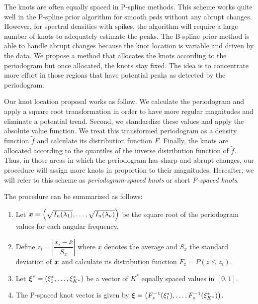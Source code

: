 \documentclass[twocolumn,final]{svjour3}
\newcommand{\bm}[1]{\mbox{\boldmath $#1$}}
\begin{document}
The knots are often equally spaced in P-spline methods.  This scheme works quite well in the P-spline prior algorithm for smooth psds without any abrupt changes.  However, for spectral densities with spikes, the algorithm will require a large number of knots to adequately estimate the peaks.  The B-spline prior method is able to handle abrupt changes because the knot location is variable and  driven by the data.  We propose a method that allocates the knots according to the periodogram but once allocated, the knots stay fixed.  The idea is to concentrate more effort in those regions that have potential peaks as detected by the periodogram.  

Our knot location proposal works as follow.  We calculate the periodogram and apply a square root transformation in order to have more regular magnitudes and eliminate a potential trend.  Second, we standardize these values and apply the absolute value function.  We treat this transformed periodogram as a density function $\widetilde{f}$ and calculate its distribution function $F$.  Finally, the knots are allocated according to the quantiles of the inverse distribution function of $\widetilde{f}$.  Thus, in those areas in which the periodogram has sharp and abrupt changes, our procedure will assign more knots in proportion to their magnitudes. Hereafter, we will refer to this scheme as \textit{periodogram-spaced knots} or short \textit{P-spaced knots}.

The procedure can be summarized as follows:
\begin{enumerate}
	\item Let $\bm{x} = \left (\sqrt{I_n(\lambda_1)}, \dots, \sqrt{I_n(\lambda_{\nu})} \right)$ be the square root of the periodogram values for each angular frequency.
	\item Define $z_i = \left|\dfrac{x_i - \bar{x}}{S_x} \right|$ where $\bar{x}$ denotes the average and $S_x$ the standard deviation of ${\bm x}$ and calculate its distribution function $F_z = P(z \leq z_i)$.
	\item Let $\bm{\xi}^* = \left(\xi_1^*,\dots,\xi_{K^*}^* \right)$ be a vector of $K^*$ equally spaced values in $[0,1]$.
	\item The P-spaced knot vector is given by $\bm{\xi} = \left(F_{z}^{-1}(\xi^*_1),\dots, F_{z}^{-1}(\xi^*_{K^*}) \right)$.
	
\end{enumerate}
\end{document}
